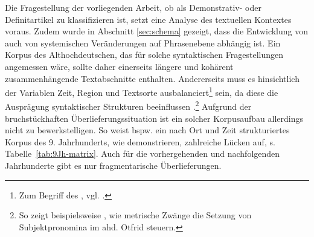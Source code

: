 Die Fragestellung der vorliegenden Arbeit, ob  als Demonstrativ- oder Definitartikel zu klassifizieren ist, setzt eine Analyse des textuellen Kontextes voraus. Zudem wurde in Abschnitt \ref{sec:schema} gezeigt, dass die Entwicklung von  auch von systemischen Veränderungen auf Phrasenebene abhängig ist. Ein Korpus des Althochdeutschen, das für solche syntaktischen Fragestellungen angemessen wäre, sollte daher einerseits längere und kohärent zusammenhängende Textabschnitte enthalten. Andererseits muss es hinsichtlich der Variablen Zeit, Region und Textsorte ausbalanciert\footnote{Zum Begriff des , vgl. \cite[6]{Atkins1992}.} sein, da diese die Ausprägung syntaktischer Strukturen beeinflussen \parencite[74]{Fleischer2011}.\footnote{So zeigt beispielsweise \textcite[47]{Eggenberger1961}, wie metrische Zwänge die Setzung von Subjektpronomina im ahd. Otfrid steuern.} Aufgrund der bruchstückhaften Überlieferungssituation ist ein solcher Korpusaufbau allerdings nicht zu bewerkstelligen. So weist bspw. ein nach Ort und Zeit strukturiertes Korpus des 9. Jahrhunderts, wie \textcite{Fleischer2011} demonstrieren, zahlreiche Lücken auf,  s. Tabelle~\ref{tab:9Jh-matrix}. Auch für die vorhergehenden und nachfolgenden Jahrhunderte gibt es nur fragmentarische Überlieferungen.

\begin{table}
\caption{Strukturiertes Korpus des 9. Jh. \parencite[75]{Fleischer2011} (T = Tatian, O = Otfrid, MF = Monseer Fragmente)\label{tab:9Jh-matrix}}
\end{table}  

